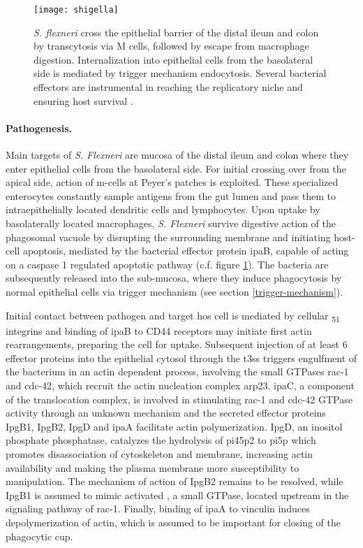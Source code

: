 \begin{figure}
  \centering
  \texttt{[image: shigella]}
  \caption[Route of infection and intracellular life-cycle of \textit{S. flexneri}.]{\textit{S. flexneri} cross the epithelial barrier of the distal ileum and colon by transcytosis via M cells, followed by escape from macrophage digestion. Internalization into epithelial cells from the basolateral side is mediated by trigger mechanism endocytosis. Several bacterial effectors are instrumental in reaching the replicatory niche and ensuring host survival \cite{Croxen2010}.}
  \label{fig:shigella}
\end{figure}

\paragraph{Pathogenesis.}
Main targets of \textit{S. Flexneri} are mucosa of the distal ileum and colon where they enter epithelial cells from the basolateral side. For initial crossing over from the apical side, action of \gls{m-cells} at Peyer's patches is exploited. These specialized enterocytes constantly sample antigens from the gut lumen and pass them to intraepithelially located dendritic cells and lymphocytes. Upon uptake by basolaterally located macrophages, \textit{S. Flexneri} survive digestive action of the phagosomal vacuole by disrupting the surrounding membrane and initiating host-cell apoptosis, mediated by the bacterial effector protein \acrshort{ipa}B, capable of acting on a caspase 1 regulated apoptotic pathway (c.f. figure \ref{fig:shigella}). The bacteria are subsequently released into the sub-mucosa, where they induce phagocytosis by normal epithelial cells via trigger mechanism (see section \ref{trigger-mechanism}).

Initial contact between pathogen and target hos cell is mediated by cellular \textalpha\textsubscript{5}\textbeta\textsubscript{1} integrins and binding of \acrshort{ipa}B to CD44 receptors may initiate first actin rearrangements, preparing the cell for uptake. Subsequent injection of at least 6 effector proteins into the epithelial cytosol through the \gls{t3ss} triggers engulfment of the bacterium in an actin dependent process, involving the small GTPases \gls{rac-1} and \gls{cdc-42}, which recruit the actin nucleation complex \gls{arp23}. \Acrshort{ipa}C, a component of the translocation complex, is involved in stimulating \gls{rac-1} and \gls{cdc-42} GTPase activity through an unknown mechanism and the secreted effector proteins IpgB1, IpgB2, IpgD and \acrshort{ipa}A facilitate actin polymerization. IpgD, an inositol phosphate phosphatase, catalyzes the hydrolysis of \acrshort{pi45p2} to \acrshort{pi5p} which promotes disassociation of cytoskeleton and membrane, increasing actin availability and making the plasma membrane more susceptibility to manipulation. The mechanism of action of IpgB2 remains to be resolved, while IpgB1 is assumed to mimic activated , a small GTPase, located upstream in the signaling pathway of \gls{rac-1}. Finally, binding of \acrshort{ipa}A to vinculin induces depolymerization of actin, which is assumed to be important for closing of the phagocytic cup.

